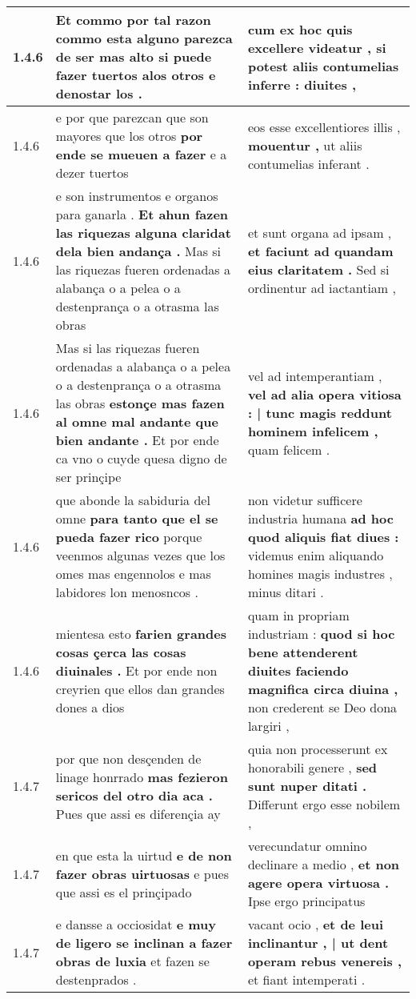 \begin{tabular}{|p{1cm}|p{6.5cm}|p{6.5cm}|}
1.4.6 & Et commo por tal razon commo esta alguno parezca de ser mas alto \textbf{ si puede fazer tuertos alos otros } e denostar los . & cum ex hoc quis excellere videatur , \textbf{ si potest aliis contumelias inferre : } diuites , \\\hline
1.4.6 & e por que parezcan que son mayores que los otros \textbf{ por ende se mueuen a fazer } e a dezer tuertos & eos esse excellentiores illis , \textbf{ mouentur , } ut aliis contumelias inferant . \\\hline
1.4.6 & e son instrumentos e organos para ganarla . \textbf{ Et ahun fazen las riquezas alguna claridat dela bien andança . } Mas si las riquezas fueren ordenadas a alabança o a pelea o a destenprança o a otrasma las obras & et sunt organa ad ipsam , \textbf{ et faciunt ad quandam eius claritatem . } Sed si ordinentur ad iactantiam , \\\hline
1.4.6 & Mas si las riquezas fueren ordenadas a alabança o a pelea o a destenprança o a otrasma las obras \textbf{ estonçe mas fazen al omne mal andante que bien andante . } Et por ende ca vno o cuyde quesa digno de ser prinçipe & vel ad intemperantiam , \textbf{ vel ad alia opera vitiosa : | tunc magis reddunt hominem infelicem , } quam felicem . \\\hline
1.4.6 & que abonde la sabiduria del omne \textbf{ para tanto que el se pueda fazer rico } porque veenmos algunas vezes que los omes mas engennolos e mas labidores lon menosncos . & non videtur sufficere industria humana \textbf{ ad hoc quod aliquis fiat diues : } videmus enim aliquando homines magis industres , minus ditari . \\\hline
1.4.6 & mientesa esto \textbf{ farien grandes cosas çerca las cosas diuinales . } Et por ende non creyrien que ellos dan grandes dones a dios & quam in propriam industriam : \textbf{ quod si hoc bene attenderent diuites faciendo magnifica circa diuina , } non crederent se Deo dona largiri , \\\hline
1.4.7 & por que non desçenden de linage honrrado \textbf{ mas fezieron sericos del otro dia aca . } Pues que assi es diferençia ay & quia non processerunt ex honorabili genere , \textbf{ sed sunt nuper ditati . } Differunt ergo esse nobilem , \\\hline
1.4.7 & en que esta la uirtud \textbf{ e de non fazer obras uirtuosas } e pues que assi es el prinçipado & verecundatur omnino declinare a medio , \textbf{ et non agere opera virtuosa . } Ipse ergo principatus \\\hline
1.4.7 & e dansse a occiosidat \textbf{ e muy de ligero se inclinan a fazer obras de luxia } et fazen se destenprados . & vacant ocio , \textbf{ et de leui inclinantur , | ut dent operam rebus venereis , } et fiant intemperati . \\\hline

\end{tabular}
